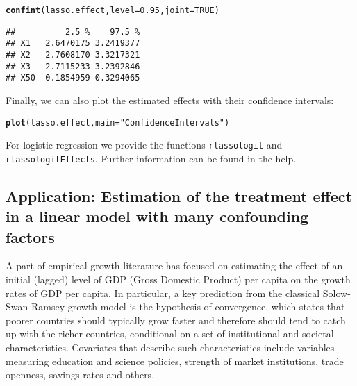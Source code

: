\documentclass{amsart}\usepackage[]{graphicx}\usepackage[]{color}
\makeatletter
\newcommand{\hlnum}[1]{\textcolor[rgb]{0.686,0.059,0.569}{#1}}%
\newcommand{\hlstr}[1]{\textcolor[rgb]{0.192,0.494,0.8}{#1}}%
\newcommand{\hlstd}[1]{\textcolor[rgb]{0.345,0.345,0.345}{#1}}%
\newcommand{\hlkwc}[1]{\textcolor[rgb]{0.333,0.667,0.333}{#1}}%
\newcommand{\hlkwd}[1]{\textcolor[rgb]{0.737,0.353,0.396}{\textbf{#1}}}%
\newenvironment{kframe}{%
 \def\at@end@of@kframe{}%
 \ifinner\ifhmode%
  \def\at@end@of@kframe{\end{minipage}}%
  \begin{minipage}{\columnwidth}%
 \fi\fi%
 \def\FrameCommand##1{\hskip\@totalleftmargin \hskip-\fboxsep
 \colorbox{shadecolor}{##1}\hskip-\fboxsep
     \hskip-\linewidth \hskip-\@totalleftmargin \hskip\columnwidth}%
 \MakeFramed {\advance\hsize-\width
   \@totalleftmargin\z@ \linewidth\hsize
   \@setminipage}}%
 {\par\unskip\endMakeFramed%
 \at@end@of@kframe}
\newenvironment{knitrout}{}{} %
\newcommand{\code}[1]{\texttt{#1}}
\makeatother
\begin{document}
\begin{knitrout}
\color{fgcolor}\begin{kframe}
\begin{alltt}
\hlkwd{confint}\hlstd{(lasso.effect,} \hlkwc{level} \hlstd{=} \hlnum{0.95}\hlstd{,} \hlkwc{joint} \hlstd{=} \hlnum{TRUE}\hlstd{)}
\end{alltt}
\begin{verbatim}
##          2.5 %    97.5 %
## X1   2.6470175 3.2419377
## X2   2.7608170 3.3217321
## X3   2.7115233 3.2392846
## X50 -0.1854959 0.3294065
\end{verbatim}
\end{kframe}
\end{knitrout}

Finally, we can also plot the estimated effects with their confidence intervals:
\begin{knitrout}
\color{fgcolor}\begin{kframe}
\begin{alltt}
\hlkwd{plot}\hlstd{(lasso.effect,} \hlkwc{main} \hlstd{=} \hlstr{"Confidence Intervals"}\hlstd{)}
\end{alltt}
\end{kframe}
\end{knitrout}

For logistic regression we provide the functions \code{rlassologit} and \code{rlassologitEffects}. Further information can be found in the help.

\subsection{Application: Estimation of the treatment effect in a linear model with many confounding factors}

A part of empirical growth literature has focused on estimating the effect of an initial (lagged) level of GDP (Gross Domestic Product) per capita on the growth rates of GDP per capita. In particular, a key prediction from the classical Solow-Swan-Ramsey growth model is the hypothesis of convergence, which states that poorer countries should typically grow faster and therefore should tend to catch up with the richer countries, conditional on a set of institutional and societal characteristics. Covariates that describe such characteristics  include variables measuring education and science policies, strength of market institutions, trade openness, savings rates and others.
\end{document}
